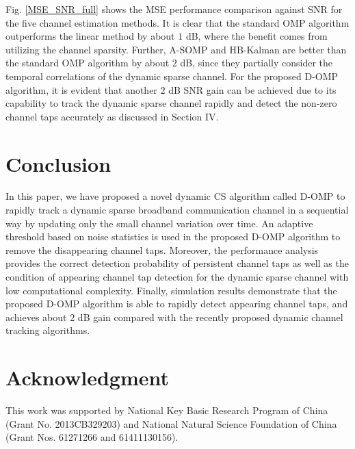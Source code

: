 \documentclass[conference]{IEEEtran}
\begin{document}
Fig. \ref{MSE_SNR_full} shows the MSE performance comparison against SNR for the five channel estimation methods.
It is clear that the standard OMP algorithm outperforms the linear method by about $1$ dB, where the benefit comes from utilizing the channel sparsity.
Further, A-SOMP and HB-Kalman are better than the standard OMP algorithm by about $2$ dB, since they partially consider the temporal correlations of the dynamic sparse channel.
For the proposed D-OMP algorithm, it is evident that another $2$ dB SNR gain can be achieved due to its capability to track the dynamic sparse channel rapidly and detect the non-zero channel taps accurately as discussed in Section IV.

\balance
\section{Conclusion}
In this paper, we have proposed a novel dynamic CS algorithm called D-OMP to rapidly track a dynamic sparse broadband communication channel in a sequential way by updating only the small channel variation over time.
An adaptive threshold based on noise statistics is used in the proposed D-OMP algorithm to remove the disappearing channel taps.
Moreover, the performance analysis provides the correct detection probability of persistent channel taps as well as the condition of appearing channel tap detection for the dynamic sparse channel with low computational complexity.
Finally, simulation results demonstrate that the proposed D-OMP algorithm is able to rapidly detect appearing channel taps, and achieves about $2$ dB gain compared with the recently proposed dynamic channel tracking algorithms.

\section*{Acknowledgment}
This work was supported by National Key Basic Research Program of China (Grant No. 2013CB329203) and National Natural Science Foundation of China (Grant Nos. 61271266 and 61411130156).
\end{document}
